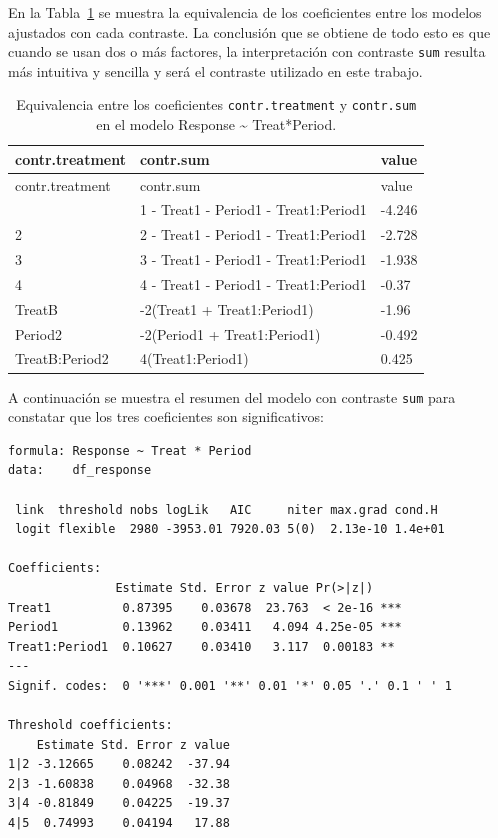 \documentclass[
  12pt,
  a4paper,
  extrafontsizes,
  onecolumn,
  openright,
  table]{memoir}
\begin{document}
En la Tabla~\ref{tbl-contrat2} se muestra la equivalencia de los
coeficientes entre los modelos ajustados con cada contraste. La
conclusión que se obtiene de todo esto es que cuando se usan dos o más
factores, la interpretación con contraste \texttt{sum} resulta más
intuitiva y sencilla y será el contraste utilizado en este trabajo.

\small

\hypertarget{tbl-contrat2}{}
\begin{longtable}[]{@{}lll@{}}
\caption{\label{tbl-contrat2}Equivalencia entre los coeficientes
\texttt{contr.treatment} y \texttt{contr.sum} en el modelo Response
\textasciitilde{} Treat*Period.}\tabularnewline
\toprule\noalign{}
contr.treatment & contr.sum & value \\
\midrule\noalign{}
\endfirsthead
\toprule\noalign{}
contr.treatment & contr.sum & value \\
\midrule\noalign{}
\endhead
\bottomrule\noalign{}
\endlastfoot
1\textbar2 & 1\textbar2 - Treat1 - Period1 - Treat1:Period1 & -4.246 \\
2\textbar3 & 2\textbar3 - Treat1 - Period1 - Treat1:Period1 & -2.728 \\
3\textbar4 & 3\textbar4 - Treat1 - Period1 - Treat1:Period1 & -1.938 \\
4\textbar5 & 4\textbar5 - Treat1 - Period1 - Treat1:Period1 & -0.37 \\
TreatB & -2(Treat1 + Treat1:Period1) & -1.96 \\
Period2 & -2(Period1 + Treat1:Period1) & -0.492 \\
TreatB:Period2 & 4(Treat1:Period1) & 0.425 \\
\end{longtable}

\normalsize

A continuación se muestra el resumen del modelo con contraste
\texttt{sum} para constatar que los tres coeficientes son
significativos:

\begin{verbatim}
formula: Response ~ Treat * Period
data:    df_response

 link  threshold nobs logLik   AIC     niter max.grad cond.H 
 logit flexible  2980 -3953.01 7920.03 5(0)  2.13e-10 1.4e+01

Coefficients:
               Estimate Std. Error z value Pr(>|z|)    
Treat1          0.87395    0.03678  23.763  < 2e-16 ***
Period1         0.13962    0.03411   4.094 4.25e-05 ***
Treat1:Period1  0.10627    0.03410   3.117  0.00183 ** 
---
Signif. codes:  0 '***' 0.001 '**' 0.01 '*' 0.05 '.' 0.1 ' ' 1

Threshold coefficients:
    Estimate Std. Error z value
1|2 -3.12665    0.08242  -37.94
2|3 -1.60838    0.04968  -32.38
3|4 -0.81849    0.04225  -19.37
4|5  0.74993    0.04194   17.88
\end{verbatim}
\end{document}
